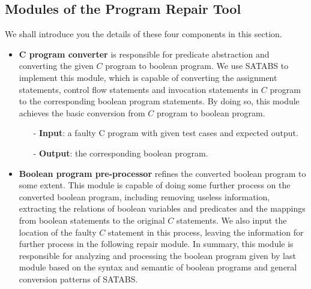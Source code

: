 \documentclass[10pt,journal,final,]{article}
\theoremstyle{definition}
\begin{document}
\subsection{Modules of the Program Repair Tool}
We shall introduce you the details of these four components in this section.

\begin{itemize}
\item \textbf{C program converter} is responsible for predicate abstraction and converting the given $C$ program to boolean program.
We use SATABS\cite{SATABS} to implement this module, which is capable of converting the assignment statements, control flow statements and invocation statements in $C$ program to the corresponding boolean program statements.
By doing so, this module achieves the basic conversion from $C$ program to boolean program.

\begin{itemize}
\item[-] \textbf{Input}: a faulty C program with given test cases and expected output.
\item[-] \textbf{Output}: the corresponding boolean program.
\end{itemize}

\item \textbf{Boolean program pre-processor} refines the converted boolean program to some extent. This module is capable of doing some further process on the converted boolean program,
including removing useless information, extracting the relations of boolean variables and predicates and the mappings from boolean statements to the original $C$ statements.
We also input the location of the faulty $C$ statement in this process, leaving the information for further process in the following repair module.
In summary, this module is responsible for analyzing and processing the boolean program given by last module based on the syntax and semantic of boolean programs and general conversion patterns of SATABS.


\end{itemize}
\end{document}
